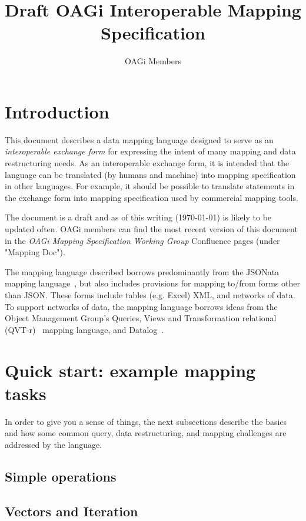 \documentclass[9pt,letterpaper]{article}
\begin{document}
\title{Draft OAGi Interoperable Mapping Specification}
\author{OAGi Members}
\maketitle

\section{Introduction}
This document describes a data mapping language designed to serve as an \textit{interoperable exchange form} for expressing the intent of many mapping and data restructuring needs.
As an interoperable exchange form, it is intended that the language can be translated (by humans and machine) into mapping specification in other languages.
For example, it should be possible to translate statements in the exchange form into mapping specification used by commercial mapping tools.

The document is a draft and as of this writing (\today) is likely to be updated often.
OAGi members can find the most recent version of this document in the \textit{OAGi Mapping Specification Working Group} Confluence pages (under "Mapping Doc").

The mapping language described borrows predominantly from the JSONata mapping language~\cite{Jsonata.org2021}, but also includes provisions for mapping to/from forms other than JSON.
These forms include tables (e.g. Excel) XML, and networks of data.
To support networks of data, the mapping language borrows ideas from the Object Management Group's Queries, Views and Transformation relational (QVT-r)~\cite{ObjectManagementGroup2016b} mapping language, and Datalog~\cite{Abiteboul1995a}.

\section{Quick start: example mapping tasks}

In order to give you a sense of things, the next subsections describe the basics and how some common query, data restructuring, and mapping challenges are addressed by the language.

\subsection{Simple operations}

\subsection{Vectors and Iteration}
\end{document}
